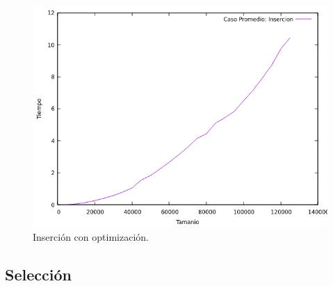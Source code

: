 \documentclass[a4paper,12pt,twoside]{article} %
\begin{document}
\begin{itemize}
\begin{figure}[h]
\begin{center}
  	\includegraphics[scale=0.8]{insercion_me_co.png}
  	\caption{Inserción con optimización.}
  	
  \end{center}
\end{figure}
	
\end{itemize}
\newpage
	
	\subsection{Selección}
	
\end{document}
